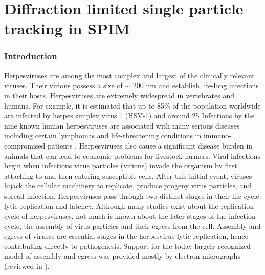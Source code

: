 \ifpdf
    \graphicspath{{Chapter/spt/Figs/Raster/}{Chapter/spt/Figs/PDF/}{Chapter/spt/Figs/}}
\else
    \graphicspath{{Chapter/spt/Figs/Vector/}{Chapter/spt/Figs/}}
\fi

\chapter{Diffraction limited single particle tracking in SPIM}

\subsection{Introduction}
Herpesviruses are among the most complex and largest of the clinically relevant viruses.
Their virions possess a size of $\sim$ 200 nm and establish life-long infections in their hosts.
Herpesviruses are extremely widespread in vertebrates and humans.
For example, it is estimated that up to 85\% of the population worldwide are infected by herpes simplex virus 1 (HSV-1) and around 25%
Infections by the nine known human herpesviruses are associated with many serious diseases including certain lymphomas and life-threatening conditions in immuno-compromised patients \cite{[1]}.
Herpesviruses also cause a significant disease burden in animals that can lead to economic problems for livestock farmers.
Viral infections begin when infectious virus particles (virions) invade the organism by first attaching to and then entering susceptible cells.
After this initial event, viruses hijack the cellular machinery to replicate, produce progeny virus particles, and spread infection.
Herpesviruses pass through two distinct stages in their life cycle: lytic replication and latency.
Although many studies exist about the replication cycle of herpesviruses, not much is known about the later stages of the infection cycle, the assembly of virus particles and their egress from the cell.
Assembly and egress of viruses are essential stages in the herpesvirus lytic replication, hence contributing directly to pathogenesis.
Support for the today largely recognized model of assembly and egress was provided mostly by electron micrographs (reviewed in \cite{[2, 3]}).

